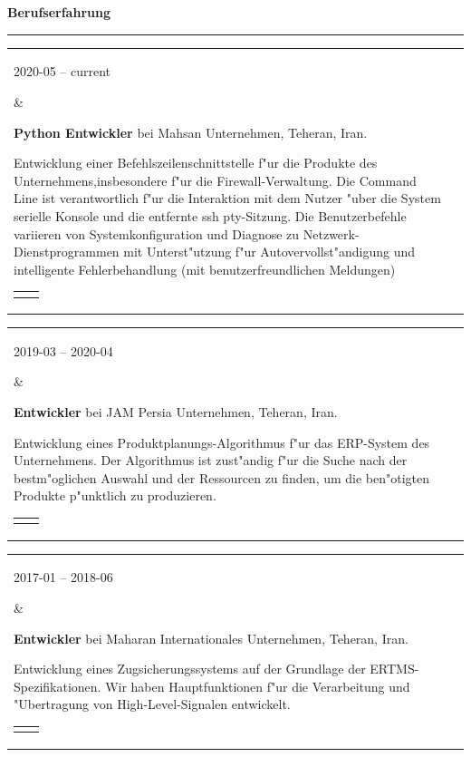 \documentclass[11pt,a4paper,oneside]{article}
\makeatletter
\newcommand{\prog}{Programmiersprache:}
\newcommand{\os}{Betriebssystem:}
\newcommand{\vcs}{Versionskontrollen:}
\newcommand{\issue}{Problemverfolgung:}
\renewcommand{\section}[1]{%
{\large\textbf{#1}}\\
\rule[9pt]{18cm}{.4pt}\vspace{-15pt}%
}
\newenvironment{mytable}{%
\begin{tabular}{@{}l@{\hspace{4mm}}l@{}}%
}{\end{tabular}}
\newcommand{\myitem}[2]{%
\parbox[t]{16mm}{#1}&\parbox[t]{16cm}{#2}\\%
}
\newenvironment{innertable}{%
\begin{tabular}{@{}l@{\hspace{5mm}}l@{}}%
}{\end{tabular}}
\newcommand{\inneritem}[2]{%
\parbox{35mm}{{\color{darkgray}#1}}&\parbox{12cm}{#2}\\%
}
\makeatother
\begin{document}
\section{Berufserfahrung}

\begin{mytable}
\myitem{2020-05 -- current}{%
\textbf{Python Entwickler} bei
Mahsan Unternehmen, Teheran, Iran.

Entwicklung einer Befehlszeilenschnittstelle f"ur die Produkte
des Unternehmens,insbesondere f"ur die Firewall-Verwaltung.
Die Command Line ist verantwortlich f"ur die Interaktion mit dem Nutzer
"uber die System serielle Konsole und die entfernte ssh pty-Sitzung.
Die Benutzerbefehle variieren von Systemkonfiguration und Diagnose
zu Netzwerk-Dienstprogrammen mit Unterst"utzung
f"ur Autovervollst"andigung und intelligente Fehlerbehandlung
(mit benutzerfreundlichen Meldungen)

\begin{innertable}
\inneritem{\prog}{Python 3}
\inneritem{\os}{Ubuntu}
\inneritem{\vcs}{Git}
\inneritem{\issue}{Gitlab}
\end{innertable}
}
\end{mytable}

\begin{mytable}
\myitem{2019-03 -- 2020-04}{%
\textbf{Entwickler} bei
JAM Persia Unternehmen, Teheran, Iran.

Entwicklung eines Produktplanungs-Algorithmus f"ur das ERP-System
des Unternehmens.
Der Algorithmus ist zust"andig f"ur die Suche nach der bestm"oglichen
Auswahl und der Ressourcen zu finden, um die ben"otigten Produkte
p"unktlich zu produzieren.

\begin{innertable}
\inneritem{\prog}{C\#}
\inneritem{\os}{Windows}
\inneritem{\vcs}{SVN}
\inneritem{\issue}{Jira}
\end{innertable}
}
\end{mytable}

\begin{mytable}
\myitem{2017-01 -- 2018-06}{
\textbf{Entwickler} bei
Maharan Internationales Unternehmen, Teheran, Iran.

Entwicklung eines Zugsicherungssystems auf der Grundlage
der ERTMS-Spezifikationen.
Wir haben Hauptfunktionen f"ur die Verarbeitung und "Ubertragung
von High-Level-Signalen entwickelt.

\begin{innertable}
\inneritem{\prog}{C mit Frama-C}
\inneritem{\os}{Windows}
\inneritem{\vcs}{TFS}
\inneritem{\issue}{Microsoft Project}
\end{innertable}
}
\end{mytable}
\end{document}
